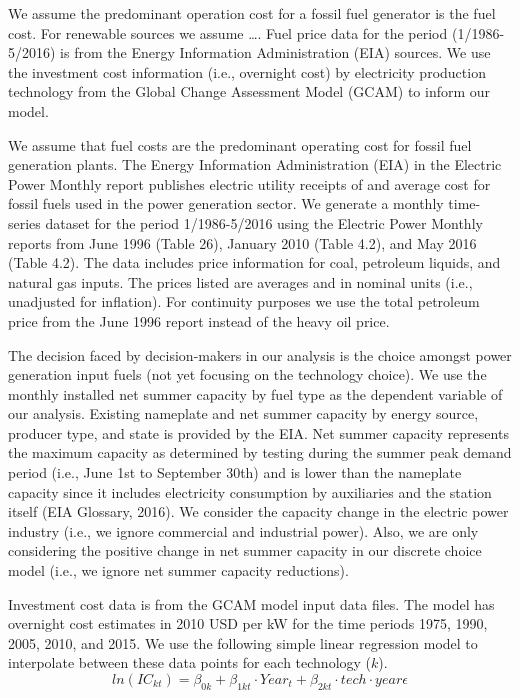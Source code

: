 \documentclass[10pt]{amsart}
\begin{document}
We assume the predominant operation cost for a fossil fuel generator is the fuel cost. 
For renewable sources we assume \ldots. 
Fuel price data for the period (1/1986-5/2016) is from the Energy Information Administration (EIA) sources.
We use the investment cost information (i.e., overnight cost) by electricity production technology from the Global Change Assessment Model (GCAM) to inform our model. 

We assume that fuel costs are the predominant operating cost for fossil fuel generation plants.
The Energy Information Administration (EIA) in the Electric Power Monthly report publishes electric utility receipts of and average cost for fossil fuels used in the power generation sector.
We generate a monthly time-series dataset for the period 1/1986-5/2016 using the Electric Power Monthly reports from June 1996 (Table 26), January 2010 (Table 4.2), and May 2016 (Table 4.2). 
The data includes price information for coal, petroleum liquids, and natural gas inputs.
The prices listed are averages and in nominal units (i.e., unadjusted for inflation).
For continuity purposes we use the total petroleum price from the June 1996 report instead of the heavy oil price.  

The decision faced by decision-makers in our analysis is the choice amongst power generation input fuels (not yet focusing on the technology choice). 
We use the monthly installed net summer capacity by fuel type as the dependent variable of our analysis. 
Existing nameplate and net summer capacity by energy source, producer type, and state is provided by the EIA.
Net summer capacity represents the maximum capacity as determined by testing during the summer peak demand period (i.e., June 1st to September 30th) and is lower than the nameplate capacity since it includes electricity consumption by auxiliaries and the station itself \parencite{}(EIA Glossary, 2016). 
We consider the capacity change in the electric power industry (i.e., we ignore commercial and industrial power).  
Also, we are only considering the positive change in net summer capacity in our discrete choice model (i.e., we ignore net summer capacity reductions). 

Investment cost data is from the GCAM model input data files.
The model has overnight cost estimates in 2010 USD per kW for the time periods 1975, 1990, 2005, 2010, and 2015. 
We use the following simple linear regression model to interpolate between these data points for each technology ($k$). 
\begin{equation}
ln(IC_{kt}) = \beta_{0k} + \beta_{1kt} \cdot Year_{t} + \beta_{2kt} \cdot tech \cdot year \epsilon
\end{equation}
\end{document}
